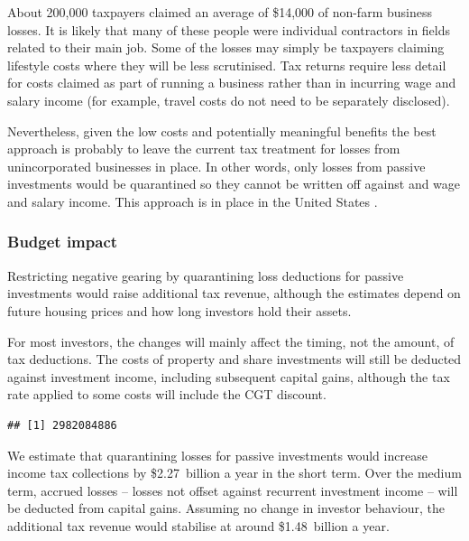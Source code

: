 \documentclass{grattan}\usepackage[]{graphicx}\usepackage[]{color}
\makeatletter
\newenvironment{kframe}{%
 \def\at@end@of@kframe{}%
 \ifinner\ifhmode%
  \def\at@end@of@kframe{\end{minipage}}%
  \begin{minipage}{\columnwidth}%
 \fi\fi%
 \def\FrameCommand##1{\hskip\@totalleftmargin \hskip-\fboxsep
 \colorbox{shadecolor}{##1}\hskip-\fboxsep
     \hskip-\linewidth \hskip-\@totalleftmargin \hskip\columnwidth}%
 \MakeFramed {\advance\hsize-\width
   \@totalleftmargin\z@ \linewidth\hsize
   \@setminipage}}%
 {\par\unskip\endMakeFramed%
 \at@end@of@kframe}
\newenvironment{knitrout}{}{} %
\makeatother
\begin{document}
About 200,000 taxpayers claimed an average of \$14,000 of non-farm business losses. It is likely that many of these people were individual contractors in fields related to their main job. Some of the losses may simply be taxpayers claiming lifestyle costs where they will be less scrutinised. Tax returns require less detail for costs claimed as part of running a business rather than in incurring wage and salary income (for example, travel costs do not need to be separately disclosed). 



Nevertheless, given the low costs and potentially meaningful benefits the best approach is probably to leave the current tax treatment for losses from unincorporated businesses in place. In other words, only losses from passive investments would be quarantined so they cannot be written off against and wage and salary income. This approach is in place in the United States . 

\subsubsection{Budget impact}
Restricting negative gearing by quarantining loss deductions for passive investments would raise additional tax revenue, although the estimates depend on future housing prices and how long investors hold their assets. 

For most investors, the changes will mainly affect the timing, not the amount, of tax deductions. The costs of property and share investments will still be deducted against investment income, including subsequent capital gains, although the tax rate applied to some costs will include the CGT discount. 

\begin{knitrout}
\color{fgcolor}\begin{kframe}
\begin{verbatim}
## [1] 2982084886
\end{verbatim}
\end{kframe}
\end{knitrout}

We estimate that quarantining losses for passive investments would increase income tax collections by \$2.27~billion a year in the short term. Over the medium term, accrued losses -- losses not offset against recurrent investment income -- will be deducted from capital gains. Assuming no change in investor behaviour, the additional tax revenue would stabilise at around \$1.48~billion a year.
\end{document}

